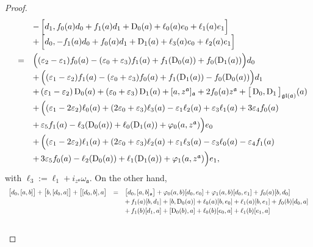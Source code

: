 \documentclass[final,1p,times,nopreprintline]{elsarticle}
\theoremstyle{definition}
\numberwithin{equation}{section}
\newcommand{\w}{\omega}
\newcommand{\ai}{\mathfrak{a}}
\numberwithin{equation}{section}
\newcommand{\D}{\operatorname{D}}
\newcommand{\gl}{\mathfrak{gl}}
\begin{document}
\begin{proof}
\begin{equation*}
\begin{array}{r c l}
&&-\,\Big[d_1,f_0(a)d_0+f_1(a)d_1+\D_0(a)+\ell_0(a)e_0+\ell_1(a)e_1\Big]\\\vspace{1.5mm}
&&+\,\Big[d_0,-f_1(a)d_0+f_0(a)d_1+\D_1(a)+\ell_3(a)e_0+\ell_2(a)e_1\Big]\\\vspace{0.75mm}
&=&\Big( (\varepsilon_2-\varepsilon_1)f_0(a)-(\varepsilon_0+\varepsilon_3)f_1(a)+f_1(\D_0(a))+f_0(\D_1(a))\Big)d_0\\\vspace{0.75mm}
&&+\,\Big( (\varepsilon_1-\varepsilon_2)f_1(a)-(\varepsilon_0+\varepsilon_3)f_0(a)+f_1(\D_1(a))-f_0(\D_0(a))\Big)d_1\\\vspace{0.75mm}
&&+\,(\varepsilon_1-\varepsilon_2)\D_0(a)+(\varepsilon_0+\varepsilon_3)\D_1(a)+[a,z^\ai]_\ai+2f_0(a)z^\ai+\big[\D_0,\D_1\big]_{\gl(\ai)}(a)\\\vspace{0.75mm}
&&+\,\Big((\varepsilon_1-2\varepsilon_2)\ell_0(a)+(2\varepsilon_0+\varepsilon_3)\ell_3(a)-\varepsilon_1\ell_2(a)+\varepsilon_3\ell_1(a)+3\varepsilon_4f_0(a)\\\vspace{0.75mm}
&&+\,\varepsilon_5f_1(a)-\ell_3(\D_0(a))+\ell_0(\D_1(a))+\varphi_0(a,z^\ai)\Big)e_0\\\vspace{0.75mm}
&&+\,\Big((\varepsilon_1-2\varepsilon_2)\ell_1(a)+(2\varepsilon_0+\varepsilon_3)\ell_2(a)+\varepsilon_1\ell_3(a)-\varepsilon_3\ell_0(a)-\varepsilon_4f_1(a)\\
&&+\,3\varepsilon_5f_0(a)-\ell_2(\D_0(a))+\ell_1(\D_1(a))+\varphi_1(a,z^\ai)\Big)e_1,
	\end{array}
	\end{equation*}
with $\ell_3:=\ell_1+i_{z^\ai}\w_\ai$. On the other hand,
	\begin{equation*}
		\begin{array}{r c l}\vspace{0.75mm}
\big[d_0,[a,b]\big]+\big[b,[d_0,a]\big]+\big[[d_0,b],a\big]&=&\big[d_0,[a,b]_\ai\big]+\varphi_0(a,b)[d_0,e_0]+\varphi_1(a,b)[d_0,e_1]+f_0(a)[b,d_0]\\\vspace{0.75mm}
&&+\,f_1(a)[b,d_1]+[b,\D_0(a)]+\ell_0(a)[b,e_0]+\ell_1(a)[b,e_1]+f_0(b)[d_0,a]\\\vspace{1.5mm}
		&&+\,f_1(b)[d_1,a]+[\D_0(b),a]+\ell_0(b)[e_0,a]+\ell_1(b)[e_1,a]\\\vspace{0.75mm}

\end{array}
\end{equation*}
\end{proof}
\end{document}
